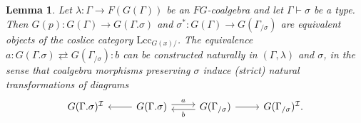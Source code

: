 \documentclass[a4paper]{article}
\newtheorem{lemma}[theorem]{Lemma}
\theoremstyle{remark}
\theoremstyle{definition}
\begin{document}
\begin{lemma}
  \label{lem:extension-vs-slice}
  Let $\lambda : \Gamma \rightarrow F(G(\Gamma))$ be an $FG$-coalgebra and let $\Gamma \vdash \sigma$ be a type.
  Then $G(p) : G(\Gamma) \rightarrow G(\Gamma.\sigma)$ and $\sigma^* : G(\Gamma) \rightarrow G(\Gamma_{/ \sigma})$ are equivalent objects of the coslice category $\mathrm{Lcc}_{G(x) /}$.
  The equivalence $a : G(\Gamma.\sigma) \rightleftarrows G(\Gamma_{/ \sigma}) : b$ can be constructed naturally in $(\Gamma, \lambda)$ and $\sigma$, in the sense that coalgebra morphisms preserving $\sigma$ induce (strict) natural transformations of diagrams
  \begin{equation}
    \label{eq:ext-equivalence}
    \begin{tikzcd}
      G(\Gamma.\sigma)^\mathcal{I} & G(\Gamma.\sigma) \arrow[r, shift left, "a"] \arrow[l] & G(\Gamma_{/ \sigma}) \arrow[l, shift left, "b"] \arrow[r] & G(\Gamma_{/ \sigma})^\mathcal{I}.
    \end{tikzcd}
  \end{equation}
\end{lemma}
\end{document}
